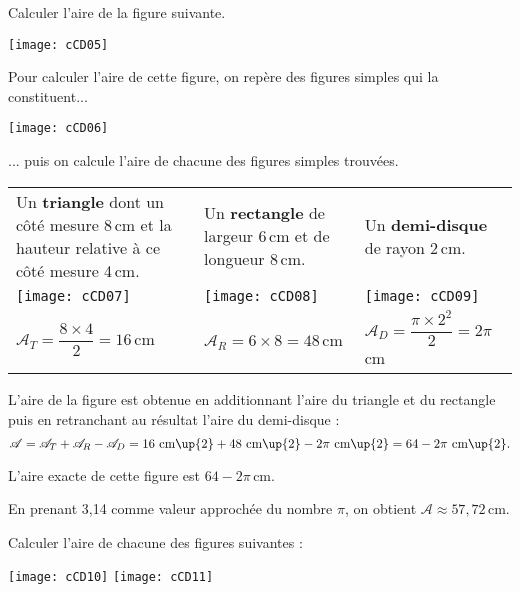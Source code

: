 \begin{exemple*1}
Calculer l'aire de la figure suivante.
\begin{center}
    \texttt{[image: cCD05]}
\end{center}
\correction
Pour calculer l'aire de cette figure, on repère des figures simples qui la constituent...
\begin{center}
    \texttt{[image: cCD06]}
\end{center}
... puis on calcule l'aire de chacune des figures simples trouvées.

\vspace{1em}

\begin{tabular}{p{.32\linewidth}|p{.32\linewidth}|p{.32\linewidth}}
Un \textbf{triangle} dont un côté mesure 8\,cm et la hauteur relative à ce côté mesure 4\,cm. & Un \textbf{rectangle} de largeur 6\,cm et de longueur 8\,cm. & Un \textbf{demi-disque} de rayon 2\,cm. \\
\texttt{[image: cCD07]} & \texttt{[image: cCD08]} & \hspace*{.3\linewidth}\texttt{[image: cCD09]}\\
  $\mathcal{A}_T = \dfrac{8 \times 4}{2}= 16$\,cm\up{2} & $\mathcal{A}_R = 6 \times 8 = 48$\,cm\up{2} & $\mathcal{A}_D =\dfrac{\pi \times 2^2}{2}= 2\pi$\,cm\up{2} \\
\end{tabular}

\vspace{1em}

L'aire de la figure est obtenue en additionnant l'aire du triangle et du rectangle puis en retranchant au résultat l'aire du demi-disque :
\[ \mathcal{A}= \mathcal{A}_T + \mathcal{A}_R - \mathcal{A}_D = 16 \text{ cm\up{2}} + 48 \text{ cm\up{2}} - 2\pi \text{ cm\up{2}} = 64 - 2\pi \text{ cm\up{2}}. \]

L'aire exacte de cette figure est $64 - 2\pi$\,cm.

En prenant 3,14 comme valeur approchée du nombre $\pi$, on obtient $\mathcal{A} \approx 57,72$\,cm.
\end{exemple*1}



\begin{exemple*1}
Calculer l'aire de chacune des figures suivantes :
\begin{center}
    \hfill \texttt{[image: cCD10]} \hfill \texttt{[image: cCD11]} \hspace*{\fill}
\end{center}

\end{exemple*1}

							
